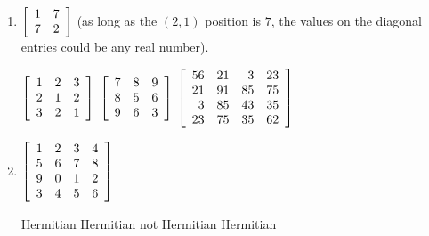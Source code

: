 
\begin{enumerate}[!HW!, start=1]
\item $\mtx{rr}{1&7\\7&2}$ (as long as the $(2,1)$ position is $7$, the values on the diagonal entries could be any real number).
\begin{multicols}{3}
\itemspade $\mtx{rrr}{1&2&3\\2&1&2\\3&2&1}$
\itemspade $\mtx{rrr}{7&8&9\\8&5&6\\9&6&3}$
\itemspade $\mtx{rrrr}{56&21&3&23\\21&91&85&75\\3&85&43&35\\23&75&35&62}$
\end{multicols}
\item $\mtx{rrrr}{1&2&3&4\\5&6&7&8\\9&0&1&2\\3&4&5&6}$

\begin{multicols}{4}
\itemspade Hermitian %
\itemspade Hermitian %
\itemspade not Hermitian %
\itemspade Hermitian %
\end{multicols}

\end{enumerate}
